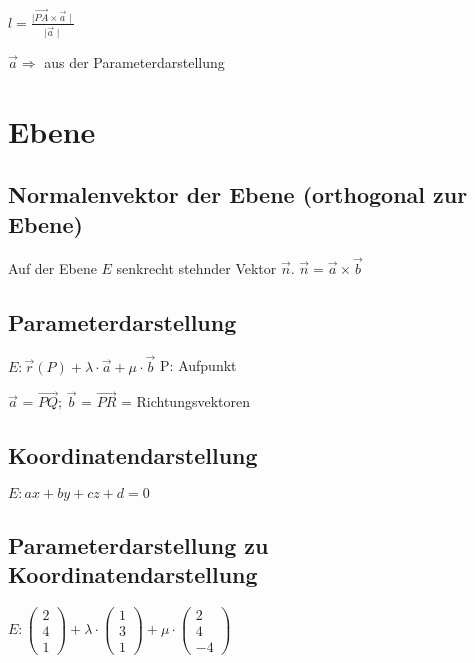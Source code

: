 \begin{multicols*}{3}
    {$l = \frac {\mid \overrightarrow{PA} \times\vec{a}\mid}{\mid\vec{a}\mid} $}

    {\small $\vec{a} \Rightarrow $  aus der Parameterdarstellung}
    \section{Ebene}

    \subsection{Normalenvektor der Ebene (orthogonal zur Ebene)}
    {Auf der Ebene $ E $ senkrecht stehnder Vektor $\vec{n}$.}
    $\vec{n} = \vec{a} \times \vec{b}$
    \WhiteSpace
    \subsection{Parameterdarstellung}
    {\large $ E: \vec{r}(P) + \lambda \cdot \vec{a} + \mu \cdot \vec{b} $}
    {P: Aufpunkt}

    {$ \vec{a}$ = $\overrightarrow{PQ} $; $ \vec{b}$ = $\overrightarrow{PR} $ = Richtungsvektoren}
    \WhiteSpace
    \subsection{Koordinatendarstellung}
    {$E: ax + by + cz + d = 0 $}

    \subsection{Parameterdarstellung zu Koordinatendarstellung}
    { $ E: \begin{pmatrix}
                2 \\
                4 \\
                1
            \end{pmatrix} + \lambda \cdot
            \begin{pmatrix}
                1 \\
                3 \\
                1
            \end{pmatrix} + \mu \cdot
            \begin{pmatrix}
                2 \\
                4 \\
                -4
            \end{pmatrix}$

}
\end{multicols*}
